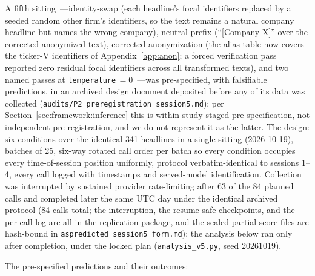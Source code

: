 A fifth sitting~---identity-swap (each headline's focal identifiers replaced by a seeded random other firm's identifiers, so the text remains a natural company headline but names the wrong company), neutral prefix (``[Company X]'' over the corrected anonymized text), corrected anonymization (the alias table now covers the ticker-V identifiers of Appendix~\ref{app:anon}; a forced verification pass reported zero residual focal identifiers across all transformed texts), and two named passes at \texttt{temperature}$\,=0$~---was pre-specified, with falsifiable predictions, in an archived design document deposited before any of its data was collected (\texttt{audits/P2\_preregistration\_session5.md}); per Section~\ref{sec:framework:inference} this is within-study staged pre-specification, not independent pre-registration, and we do not represent it as the latter. The design: six conditions over the identical 341 headlines in a single sitting (2026-10-19), batches of 25, six-way rotated call order per batch so every condition occupies every time-of-session position uniformly, protocol verbatim-identical to sessions 1--4, every call logged with timestamps and served-model identification. Collection was interrupted by sustained provider rate-limiting after 63 of the 84 planned calls and completed later the same UTC day under the identical archived protocol (84 calls total; the interruption, the resume-safe checkpoints, and the per-call log are all in the replication package, and the sealed partial score files are hash-bound in \texttt{aspredicted\_session5\_form.md}); the analysis below ran only after completion, under the locked plan (\texttt{analysis\_v5.py}, seed 20261019).

The pre-specified predictions and their outcomes:

